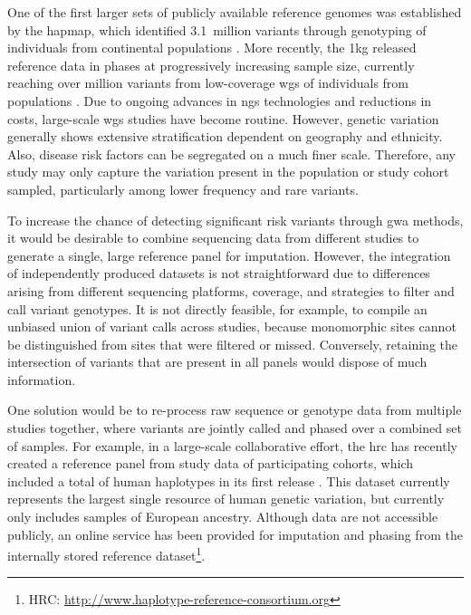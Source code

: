 One of the first larger sets of publicly available reference genomes was established by the \gls{hapmap}, which identified 3.1~million variants through genotyping of  individuals from  continental populations \citep{Frazer:2007kha, InternationalHapMapConsortium:2010en}.
More recently, the \gls{1kg} released reference data in  phases at progressively increasing sample size, currently reaching over  million variants from low-coverage \gls{wgs} of  individuals from  populations \citep{GenomesProjectConsortium:2012co, Auton:2015gk}.
Due to ongoing advances in \gls{ngs} technologies and reductions in costs, large-scale \gls{wgs} studies have become routine.
However, genetic variation generally shows extensive stratification dependent on geography and ethnicity.
Also, disease risk factors can be segregated on a much finer scale.
Therefore, any study may only capture the variation present in the population or study cohort sampled, particularly among lower frequency and rare variants.

To increase the chance of detecting significant risk variants through \gls{gwa} methods, it would be desirable to combine sequencing data from different studies to generate a single, large reference panel for imputation.
However, the integration of independently produced datasets is not straightforward due to differences arising from different sequencing platforms, coverage, and strategies to filter and call variant genotypes.
It is not directly feasible, for example, to compile an unbiased union of variant calls across studies, because monomorphic sites cannot be distinguished from sites that were filtered or missed.
Conversely, retaining the intersection of variants that are present in all panels would dispose of much information.

One solution would be to re-process raw sequence or genotype data from multiple studies together, where variants are jointly called and phased over a combined set of samples.
For example, in a large-scale collaborative effort, the \gls{hrc} has recently created a reference panel from study data of  participating cohorts, which included a total of  human haplotypes in its first release \citep{McCarthy:2016gs}.
This dataset currently represents the largest single resource of human genetic variation, but currently only includes samples of European ancestry.
Although data are not accessible publicly, an online service has been provided for imputation and phasing from the internally stored reference dataset\footnote{HRC: \url{http://www.haplotype-reference-consortium.org} }.

